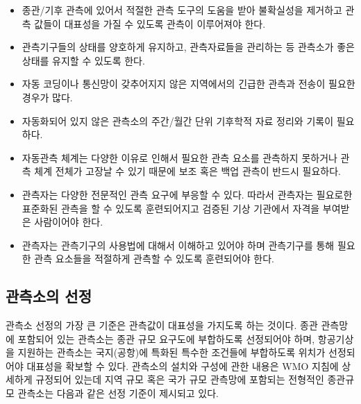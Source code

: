 \begin{itemize}
\begin{itemize}
	\item 종관/기후 관측에 있어서 적절한 관측 도구의 도움을 받아 불확실성을 제거하고 관측 값들이 대표성을 가질 수 있도록 관측이 이루어져야 한다.
	\item 관측기구들의 상태를 양호하게 유지하고, 관측자료들을 관리하는 등 관측소가 좋은 상태를 유지할 수 있도록 한다.
	\item 자동 코딩이나 통신망이 갖추어지지 않은 지역에서의 긴급한 관측과 전송이 필요한 경우가 많다.
	\item 자동화되어 있지 않은 관측소의 주간/월간 단위 기후학적 자료 정리와 기록이 필요하다.
	\item 자동관측 체계는 다양한 이유로 인해서 필요한 관측 요소를 관측하지 못하거나 관측 체계 전체가 고장날 수 있기 때문에 보조 혹은 백업 관측이 반드시 필요하다.
	\item 관측자는 다양한 전문적인 관측 요구에 부응할 수 있다. 따라서 관측자는 필요로한 표준화된 관측을 할 수 있도록 훈련되어지고 검증된 기상 기관에서 자격을 부여받은 사람이어야 한다. 
	\item 관측자는 관측기구의 사용법에 대해서 이해하고 있어야 하며 관측기구를 통해 필요한 관측 요소들을 적절하게 관측할 수 있도록 훈련되어야 한다.
\end{itemize}
	
\subsection{관측소의 선정}
관측소 선정의 가장 큰 기준은 관측값이 대표성을 가지도록 하는 것이다. 종관 관측망에 포함되어 있는 관측소는 종관 규모 요구도에 부합하도록 선정되어야 하며, 항공기상을 지원하는 관측소는 국지(공항)에 특화된 특수한 조건들에 부합하도록 위치가 선정되어야 대표성을 확보할 수 있다. 관측소의 설치와 구성에 관한 내용은 WMO 지침에 상세하게 규정되어 있는데
지역 규모 혹은 국가 규모 관측망에 포함되는 전형적인 종관규모 관측소는 다음과 같은 선정 기준이 제시되고 있다.


\end{itemize}
